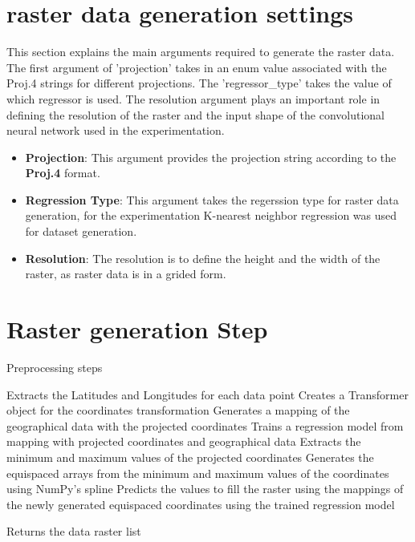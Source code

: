 \section{raster data generation settings}
This section explains the main arguments required to generate the raster data. The first argument of 'projection' takes in an enum value associated with the Proj.4 strings for different projections. The 'regressor\_type' takes the value of which regressor is used. The resolution argument plays an important role in defining the resolution of the raster and the input shape of the convolutional neural network used in the experimentation.
\begin{itemize}
    \item \textbf{Projection}: This argument provides the projection string according to the \textbf{Proj.4} format.
    \item  \textbf{Regression Type}: This argument takes the regerssion type for raster data generation, for the experimentation K-nearest neighbor regression was used for dataset generation.
    \item \textbf{Resolution}: The resolution is to define the height and the width of the raster, as raster data is in a grided form.
\end{itemize}


\section{Raster generation Step}
\begin{algorithm}
    \caption{Preprocessing steps}
    \label{}
    \begin{algorithmic}[1]
        \STATE Extracts the Latitudes and Longitudes for each data point
        \STATE Creates a Transformer object for the coordinates transformation
        \STATE Generates a mapping of the geographical data with the projected coordinates
        \STATE Trains a regression model from mapping with projected coordinates and geographical data
        \STATE Extracts the minimum and maximum values of the projected coordinates
        \STATE Generates the equispaced arrays from the minimum and maximum values of the coordinates using NumPy's spline
        \STATE Predicts the values to fill the raster using the mappings of the newly generated equispaced coordinates  using the trained regression model

        \ENDFOR
        \STATE Returns the data raster list
    \end{algorithmic}
\end{algorithm}